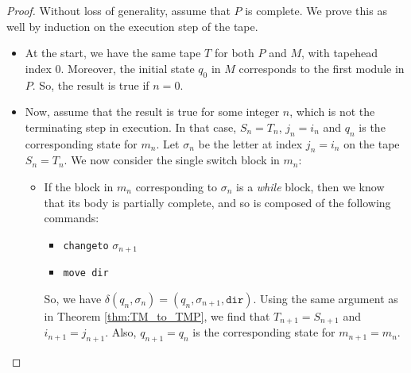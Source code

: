 \documentclass{article}
\begin{document}
    \begin{proof}
        Without loss of generality, assume that $P$ is complete. We prove this as well by induction on the execution step of the tape. 
        \begin{itemize}
            \item At the start, we have the same tape $T$ for both $P$ and $M$, with tapehead index $0$. Moreover, the initial state $q_0$ in $M$ corresponds to the first module in $P$. So, the result is true if $n = 0$. 
            
            \item Now, assume that the result is true for some integer $n$, which is not the terminating step in execution. In that case, $S_n = T_n$, $j_n = i_n$ and $q_n$ is the corresponding state for $m_n$. Let $\sigma_n$ be the letter at index $j_n = i_n$ on the tape $S_n = T_n$. We now consider the single switch block in $m_n$:
            \begin{itemize}
                \item If the block in $m_n$ corresponding to $\sigma_n$ is a \textit{while} block, then we know that its body is partially complete, and so is composed of the following commands:
                \begin{itemize}
                    \item \texttt{changeto} $\sigma_{n+1}$
                    \item \texttt{move dir}
                \end{itemize}
                So, we have $\delta(q_n, \sigma_n) = (q_n, \sigma_{n+1}, \texttt{dir})$. Using the same argument as in Theorem \ref{thm:TM_to_TMP}, we find that $T_{n+1} = S_{n+1}$ and $i_{n+1} = j_{n+1}$. Also, $q_{n+1} = q_n$ is the corresponding state for $m_{n+1} = m_n$. 
                

\end{itemize}
\end{itemize}
\end{proof}
\end{document}

